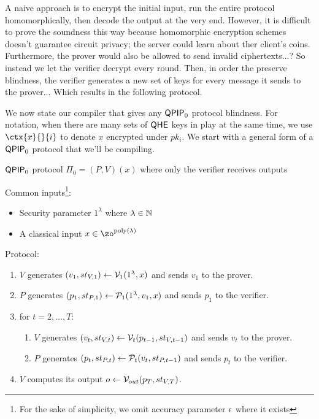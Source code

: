 A naive approach is to encrypt the initial input,
run the entire protocol homomorphically,
then decode the output at the very end.
However, it is difficult to prove the soundness this way because homomorphic encryption schemes doesn't guarantee circuit privacy;
the server could learn about ther client's coins.
Furthermore, the prover would also be allowed to send invalid ciphertexts...?
So instead we let the verifier decrypt every round.
Then, in order the preserve blindness, the verifier generates a new set of keys for every message it sends to the prover...
Which results in the following protocol.


We now state our compiler that gives any $\operatorname{\mathsf{QPIP}}_0$ protocol blindness.
For notation, when there are many sets of $\mathsf{QHE}$ keys in play at the same time,
we use $\ctx{x}{}{i}$ to denote $x$ encrypted under $pk_i$.
We start with a general form of a $\operatorname{\mathsf{QPIP}}_0$ protocol that we'll be compiling.

\begin{protocol}{$\operatorname{\mathsf{QPIP}}_0$ protocol $\Pi_0=(P, V)(x)$ where only the verifier receives outputs}
	
	Common inputs\footnote{For the sake of simplicity, we omit accuracy parameter $\epsilon$ where it exists}:
	\begin{itemize}
		\item Security parameter $1^\lambda$ where $\lambda\in\mathbb{N}$
		\item A classical input $x\in\zo^{\poly(\lambda)}$
	\end{itemize}

    Protocol:
	\begin{enumerate}
		\item $V$ generates $(v_1, st_{V, 1})\leftarrow\mathcal{V}_1(1^\lambda, x)$ and sends $v_1$ to the prover.
		\item $P$ generates $(p_1, st_{P, 1})\leftarrow\mathcal{P}_1(1^\lambda, v_1, x)$ and sends $p_1$ to the verifier.
		\item for $t=2,\ldots,T$:
		\begin{enumerate}
			\item $V$ generates $(v_t, st_{V, t})\leftarrow\mathcal{V}_t(p_{t-1}, st_{V, t-1})$ and sends $v_t$ to the prover.
			\item $P$ generates $(p_t, st_{P, t})\leftarrow\mathcal{P}_t(v_t, st_{P, t-1})$ and sends $p_t$ to the verifier.
		\end{enumerate}
		\item $V$ computes its output $o\leftarrow\mathcal{V}_{out}(p_T, st_{V, T})$.
	\end{enumerate}

\end{protocol}

